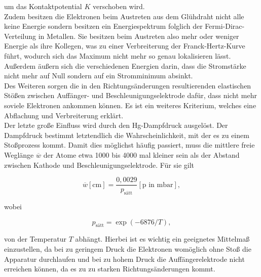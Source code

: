 um das Kontaktpotential $K$ verschoben wird.\\
Zudem besitzen die Elektronen beim Austreten aus dem Glühdraht nicht alle keine Energie sondern besitzen ein Energiespektrum folglich der Fermi-Dirac-Verteilung in Metallen.
Sie besitzen beim Austreten also mehr oder weniger Energie als ihre Kollegen, was zu einer Verbreiterung der Franck-Hertz-Kurve führt, wodurch sich das Maximum nicht mehr so genau lokalisieren lässt.
Außerdem äußern sich die verschiedenen Energien darin, dass die Stromstärke nicht mehr auf Null sondern auf ein Stromminimum absinkt.\\
Des Weiteren sorgen die in den Richtungsänderungen resultierenden elastischen Stößen zwischen Auffänger- und Beschleunigungselektrode dafür, dass nicht mehr soviele Elektronen ankommen können.
Es ist ein weiteres Kriterium, welches eine Abflachung und Verbreiterung erklärt.\\
Der letzte große Einfluss wird durch den Hg-Dampfdruck ausgelöst.
Der Dampfdruck bestimmt letztendlich die Wahrscheinlichkeit, mit der es zu einem Stoßprozess kommt.
Damit dies möglichst häufig passiert, muss die mittlere freie Weglänge $\overline{w}$ der Atome etwa 1000 bis 4000 mal kleiner sein als der Abstand zwischen Kathode und Beschleunigungselektrode.
Für sie gilt

\begin{equation}
  \overline{w} [\text{cm}] = \frac{0,0029}{p_{\text{sätt}}} [\text{p in mbar}] \label{eqn:7},
\end{equation}

wobei

\begin{equation}
  p_{\text{sätt}} = \exp(-6876/T) \label{eqn:8},
\end{equation}

von der Temperatur $T$ abhängt.
Hierbei ist es wichtig ein geeignetes Mittelmaß einzustellen, da bei zu geringem Druck die Elektronen womöglich ohne Stoß die Apparatur durchlaufen und bei zu hohem Druck die Auffängerelektrode nicht erreichen können, da es zu zu starken Richtungsänderungen kommt.









